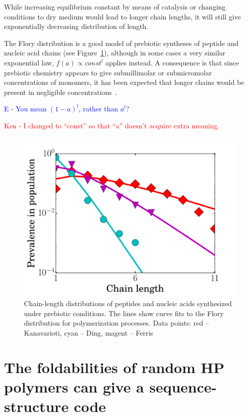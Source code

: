 \documentclass[journal=jacsat,manuscript=article,layout=twocolumn]{achemso}
\newcommand*{\red}[1]{\textcolor{red}{#1}}
\newcommand*{\blue}[1]{\textcolor{blue}{#1}}
\begin{document}
 While increasing equilibrium constant by means of catalysis or 
changing conditions to dry medium would lead to longer chain lengths, it will still give 
exponentially decreasing distribution of length\cite{Derr2012}. 

The Flory distribution is a good model of prebiotic syntheses of peptide and nucleic acid chains 
(see Figure~\ref{fig:some_flory}), although in some cases a very similar exponential law, 
$f(a)\propto const^l$ applies instead\cite{nowak2008prevolutionary,Derr2012}.  A consequence is 
that since prebiotic chemistry appears to give submillimolar or submicromolar concentrations of 
monomers, it has been expected that longer chains would be present in negligible 
concentrations~\cite{Aubrey2009,Kanavarioti2001,Lazcano1996}.

\blue{E - You mean $(1-a)^l$, rather than $a^l$?}

\red{Ken - I changed to ``const'' so that ``a'' doesn't acquire extra meaning.}

\begin{figure}[h!]
  \centering
  \includegraphics[width=\columnwidth]{pictures/some_flory.pdf} 
  \caption{Chain-length distributions of peptides and nucleic acids synthesized under prebiotic 
conditions.  The lines show curve fits to the Flory distribution for polymerization processes. Data 
points: red -- Kanavarioti\cite{Kanavarioti2001}, cyan -- Ding\cite{Ding1996}, 
magent -- Ferris\cite{Ferris1999}}
  \label{fig:some_flory}
\end{figure}




\section{The foldabilities of random HP polymers can give a sequence-structure code}
\end{document}
